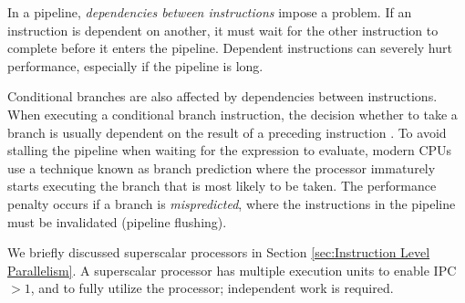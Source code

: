 In a pipeline, \textit{dependencies between instructions} impose a problem. If an instruction is dependent on another, it must wait for the other instruction to complete before it enters the pipeline. Dependent instructions can severely hurt performance, especially if the pipeline is long.

Conditional branches are also affected by dependencies between instructions. When executing a conditional branch instruction, the decision whether to take a branch is usually dependent on the result of a preceding instruction \cite{Boncz2005-wj}. To avoid stalling the pipeline when waiting for the expression to evaluate, modern CPUs use a technique known as branch prediction where the processor immaturely starts executing the branch that is most likely to be taken. The performance penalty occurs if a branch is \textit{mispredicted}, where the instructions in the pipeline must be invalidated (pipeline flushing).

We briefly discussed superscalar processors in Section \ref{sec:Instruction Level Parallelism}. A superscalar processor has multiple execution units to enable IPC $> 1$, and to fully utilize the processor; independent work is required.

